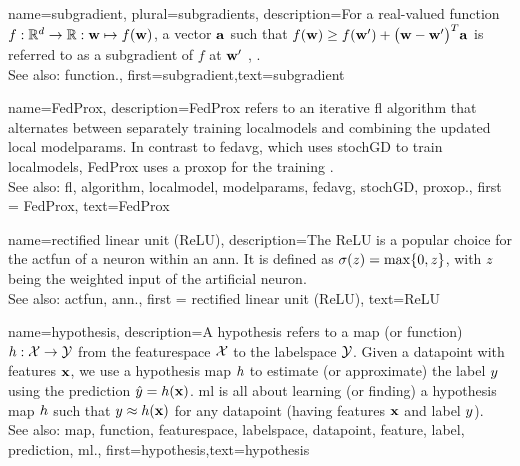 {name={subgradient}, plural={subgradients},
description={For a real-valued \gls{function} $f: \mathbb{R}^{d} \rightarrow \mathbb{R}: {\bf w} \mapsto f({\bf w})$, 
		a vector ${\bf a}$ such that $f({\bf w}) \geq  f({\bf w}') +\big({\bf w}-{\bf w}' \big)^{T} {\bf a}$ is 
		referred to as a subgradient of $f$ at ${\bf w}'$ \cite{BertCvxAnalOpt}, \cite{BertsekasNonLinProgr}.
		\\
		See also: \gls{function}.},
	first={subgradient},text={subgradient} 
}

{name={FedProx},
	description={FedProx refers to an iterative \gls{fl} \gls{algorithm} that alternates between separately training \glspl{localmodel} and combining the updated local \gls{modelparams}. In contrast to \gls{fedavg}, which uses 
		\gls{stochGD} to train \glspl{localmodel}, FedProx uses a \gls{proxop} for the training \cite{FedProx2020}.
					\\ 
		See also: \gls{fl}, \gls{algorithm}, \gls{localmodel}, \gls{modelparams}, \gls{fedavg}, \gls{stochGD}, \gls{proxop}.}, 
	first = {FedProx}, text={FedProx} 
}

{name={rectified linear unit (ReLU)},
	description={The ReLU is 
		a popular choice for the \gls{actfun} of a neuron within an \gls{ann}. It is defined 
		as $\sigma(z) = \max\{0,z\}$, with $z$ being the weighted input of the artificial 
		neuron.
					\\ 
		See also: \gls{actfun}, \gls{ann}.}, first = {rectified linear unit (ReLU)}, text={ReLU} 
}

{name={hypothesis},
	description={A hypothesis refers to a \gls{map} (or \gls{function}) $h: \mathcal{X} \rightarrow \mathcal{Y}$ from the 
		\gls{featurespace} $\mathcal{X}$ to the \gls{labelspace} $\mathcal{Y}$. 
		Given a \gls{datapoint} with \glspl{feature} ${\bf x}$, we use a hypothesis \gls{map} $h$
		to estimate (or approximate) the \gls{label} $y$ using the \gls{prediction}  
		$\hat{y} = h({\bf x})$. \Gls{ml} is all about learning (or finding) a 
		hypothesis \gls{map} $h$ such that $y \approx h({\bf x})$ 
		for any \gls{datapoint} (having \glspl{feature} ${\bf x}$ and \gls{label} $y$).
					\\ 
		See also: \gls{map}, \gls{function}, \gls{featurespace}, \gls{labelspace}, \gls{datapoint}, \gls{feature}, \gls{label}, \gls{prediction}, \gls{ml}.},
	first={hypothesis},text={hypothesis}  
}



